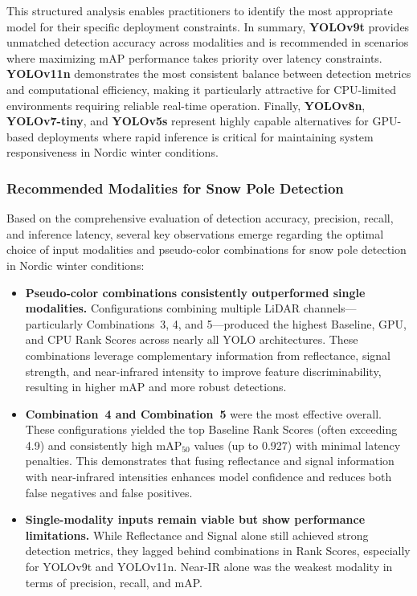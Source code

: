 \documentclass[runningheads]{llncs}
\begin{document}
This structured analysis enables practitioners to identify the most appropriate model for their specific deployment constraints. In summary, \textbf{YOLOv9t} provides unmatched detection accuracy across modalities and is recommended in scenarios where maximizing mAP performance takes priority over latency constraints. \textbf{YOLOv11n} demonstrates the most consistent balance between detection metrics and computational efficiency, making it particularly attractive for CPU-limited environments requiring reliable real-time operation. Finally, \textbf{YOLOv8n}, \textbf{YOLOv7-tiny}, and \textbf{YOLOv5s} represent highly capable alternatives for GPU-based deployments where rapid inference is critical for maintaining system responsiveness in Nordic winter conditions.

\subsubsection{Recommended Modalities for Snow Pole Detection}

Based on the comprehensive evaluation of detection accuracy, precision, recall, and inference latency, several key observations emerge regarding the optimal choice of input modalities and pseudo-color combinations for snow pole detection in Nordic winter conditions:

\begin{itemize}
    \item \textbf{Pseudo-color combinations consistently outperformed single modalities.} Configurations combining multiple LiDAR channels---particularly Combinations~3, 4, and 5---produced the highest Baseline, GPU, and CPU Rank Scores across nearly all YOLO architectures. These combinations leverage complementary information from reflectance, signal strength, and near-infrared intensity to improve feature discriminability, resulting in higher mAP and more robust detections.
    
    \item \textbf{Combination~4 and Combination~5} were the most effective overall. These configurations yielded the top Baseline Rank Scores (often exceeding 4.9) and consistently high mAP$_{50}$ values (up to 0.927) with minimal latency penalties. This demonstrates that fusing reflectance and signal information with near-infrared intensities enhances model confidence and reduces both false negatives and false positives.
    
    \item \textbf{Single-modality inputs remain viable but show performance limitations.} While Reflectance and Signal alone still achieved strong detection metrics, they lagged behind combinations in Rank Scores, especially for YOLOv9t and YOLOv11n. Near-IR alone was the weakest modality in terms of precision, recall, and mAP.

\end{itemize}
\end{document}
